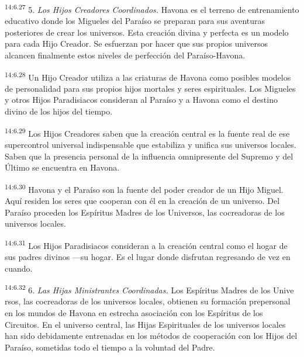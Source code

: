 \par
\textsuperscript{14:6.27} 5. \textit{Los Hijos Creadores Coordinados.} Havona es el terreno de entrenamiento educativo donde los Migueles del Paraíso se preparan para sus aventuras posteriores de crear los universos. Esta creación divina y perfecta es un modelo para cada Hijo Creador. Se esfuerzan por hacer que sus propios universos alcancen finalmente estos niveles de perfección del Paraíso-Havona.

\par
\textsuperscript{14:6.28} Un Hijo Creador utiliza a las criaturas de Havona como posibles modelos de personalidad para sus propios hijos mortales y seres espirituales. Los Migueles y otros Hijos Paradisiacos consideran al Paraíso y a Havona como el destino divino de los hijos del tiempo.

\par
\textsuperscript{14:6.29} Los Hijos Creadores saben que la creación central es la fuente real de ese supercontrol universal indispensable que estabiliza y unifica sus universos locales. Saben que la presencia personal de la influencia omnipresente del Supremo y del Último se encuentra en Havona.

\par
\textsuperscript{14:6.30} Havona y el Paraíso son la fuente del poder creador de un Hijo Miguel. Aquí residen los seres que cooperan con él en la creación de un universo. Del Paraíso proceden los Espíritus Madres de los Universos, las cocreadoras de los universos locales.

\par
\textsuperscript{14:6.31} Los Hijos Paradisiacos consideran a la creación central como el hogar de sus padres divinos ---su hogar. Es el lugar donde disfrutan regresando de vez en cuando.

\par
\textsuperscript{14:6.32} 6. \textit{Las Hijas Ministrantes Coordinadas.} Los Espíritus Madres de los Unive rsos, las cocreadoras de los universos locales, obtienen su formación prepersonal en los mundos de Havona en estrecha asociación con los Espíritus de los Circuitos. En el universo central, las Hijas Espirituales de los universos locales han sido debidamente entrenadas en los métodos de cooperación con los Hijos del Paraíso, sometidas todo el tiempo a la voluntad del Padre.

